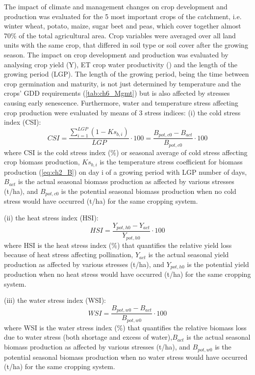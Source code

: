 The impact of climate and management changes on crop development and production was evaluated for the 5 most important crops of the catchment, i.e. winter wheat, potato, maize, sugar beet and peas, which cover together almost 70\% of the total agricultural area. Crop variables were averaged over all land units with the same crop, that differed in soil type or soil cover after the growing season. The impact on crop development and production was evaluated by analysing crop yield (Y),  ET crop water productivity (\WPET) and the length of the growing period (LGP). The length of the growing period, being the time between crop germination and maturity, is not just determined by temperature and the crops' GDD requirements (\autoref{tab:ch6_Mgmt}) but is also affected by stresses causing early senescence. Furthermore, water and temperature stress affecting crop production were evaluated by means of 3 stress indices: 
(i)  the cold stress index (CSI):
\begin{equation}
 CSI=\dfrac{\sum_{i=1}^{LGP} (1-Ks_{b,i})}{LGP} \cdot 100= \dfrac{B_{pot,c0}-B_{act}}{B_{pot,c0}}\cdot 100
  \label{eq:ch7_CSI}
\end{equation}
where CSI is the cold stress index (\%) or seasonal average of cold stress affecting crop biomass production,  $Ks_{b,i}$ is the temperature stress coefficient for biomass production (\autoref{eq:ch2_B}) on day i of a growing period with LGP number of days, $B_{act}$ is the actual seasonal biomass production as affected by various stresses (\si{t/ha}), and $B_{pot,c0}$ is the potential seasonal biomass production when no cold stress would have occurred (\si{t/ha}) for the same cropping system.

(ii)  the heat stress index (HSI):
\begin{equation}
 HSI= \dfrac{Y_{pot,h0}-Y_{act}}{Y_{pot,h0}}\cdot 100
   \label{eq:ch7_HSI}
\end{equation}
where HSI is the heat stress index (\%) that quantifies the relative yield loss because of heat stress affecting pollination, $Y_{act}$ is the actual seasonal yield production as affected by various stresses (t/ha), and $Y_{pot,h0}$ is the potential yield production when no heat stress would have occurred (t/ha) for the same cropping system.

(iii)  the water stress index (WSI): 
\begin{equation}
 WSI= \dfrac{B_{pot,w0}-B_{act}}{B_{pot,w0}}\cdot 100
   \label{eq:ch7_WSI}
\end{equation}
where WSI is the water stress index (\%) that quantifies the relative biomass loss due to water stress (both shortage and excess of water),$B_{act}$ is the actual seasonal biomass production as affected by various stresses (t/ha), and $B_{pot,w0}$ is the potential seasonal biomass production when no water stress would have occurred (t/ha) for the same cropping system.

